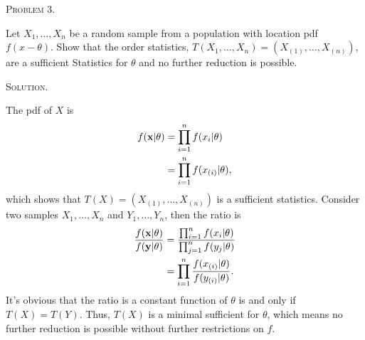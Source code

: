 \documentclass{article}
\begin{document}
\begin{CJK}{UTF8}{gbsn}
    \begin{shaded}
        \noindent\textsc{Problem 3.}\par
        Let $X_1,\ldots,X_n$ be a random sample from a population with location pdf $f(x-\theta)$.
        Show that the order statistics, $T(X_1,\ldots,X_n) = (X_{(1)},\ldots,X_{(n)})$, are a sufficient
        Statistics for $\theta$ and no further reduction is possible.
    \end{shaded}
    \noindent\textsc{Solution.}\par
    The pdf of $X$ is
    \begin{align}
        f(\mathbf{x}|\theta) & = \prod_{i=1}^n f(x_i|\theta) \notag     \\
                             & = \prod_{i=1}^n f(x_{(i)}|\theta),\notag
    \end{align}
    which shows that $T(X)=(X_{(1)},\ldots, X_{(n)})$ is a sufficient statistics.
    Consider two samples $X_1,\ldots, X_n$ and $Y_1,\ldots,Y_n$, then the ratio is
    \begin{align}
        \frac{f(\mathbf{x}|\theta)}{f(\mathbf{y}|\theta)} & = \frac{\prod_{i=1}^n f(x_i|\theta)}{\prod_{j=1}^n f(y_j|\theta)} \notag \\
                                                          & = \prod_{i=1}^n \frac{f(x_{(i)}|\theta)}{f(y_{(i)}|\theta)}. \notag
    \end{align}
    It's obvious that the ratio is a constant function of $\theta$ is and only if $T(X)=T(Y)$. Thus, $T(X)$
    is a minimal sufficient for $\theta$, which means no further reduction is possible without further restrictions on $f$.


\end{CJK}
\end{document}
